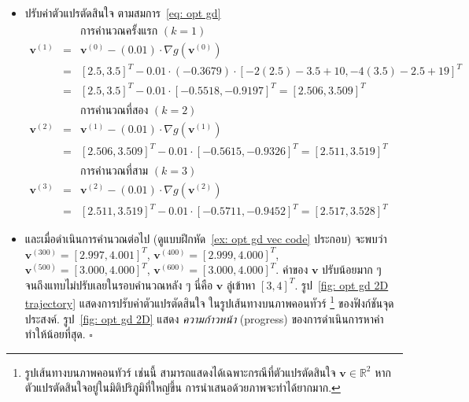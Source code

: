 \begin{itemize}
\item ปรับค่าตัวแปรตัดสินใจ ตามสมการ~\ref{eq: opt gd}
	\\ 
	\begin{eqnarray}
	&\;& \mbox{การคำนวณครั้งแรก } (k=1)
	\nonumber \\
	\bm{v}^{(1)} &=& \bm{v}^{(0)} - (0.01) \cdot \nabla g (\bm{v}^{(0)})
	\nonumber \\
	&=& [2.5, 3.5]^T - 0.01 \cdot (-0.3679) \cdot [-2(2.5)-3.5+10, -4(3.5)-2.5+19]^T
	\nonumber \\
	&=& [2.5, 3.5]^T - 0.01 \cdot [-0.5518,
	-0.9197]^T = [2.506, 3.509]^T
\nonumber \\	
	&\;& \mbox{การคำนวณที่สอง } (k=2)
\nonumber \\		
	\bm{v}^{(2)} &=& \bm{v}^{(1)} - (0.01) \cdot \nabla g (\bm{v}^{(1)})
\nonumber \\	
&=& [2.506, 3.509]^T - 0.01 \cdot [-0.5615, -0.9326]^T = [2.511, 3.519]^T
\nonumber \\
	&\;& \mbox{การคำนวณที่สาม } (k=3)
	\nonumber \\
	\bm{v}^{(3)} &=& \bm{v}^{(2)} - (0.01) \cdot \nabla g (\bm{v}^{(2)})
\nonumber \\	
&=& [2.511, 3.519]^T - 0.01 \cdot [-0.5711, -0.9452]^T = [2.517, 3.528]^T
\nonumber 
	\nonumber
	\end{eqnarray}
	
	\item และเมื่อดำเนินการคำนวณต่อไป
	(ดูแบบฝึกหัด~\ref{ex: opt gd vec code} ประกอบ)
	จะพบว่า 
	$\bm{v}^{(300)} = [2.997, 4.001]^T$,
	$\bm{v}^{(400)} = [2.999, 4.000]^T$,
	$\bm{v}^{(500)} = [3.000, 4.000]^T$,
	$\bm{v}^{(600)} = [3.000, 4.000]^T$.
	ค่าของ $\bm{v}$ ปรับน้อยมาก ๆ จนถึงแทบไม่ปรับเลยในรอบคำนวณหลัง ๆ นี่คือ $\bm{v}$ ลู่เข้าหา $[3, 4]^T$.
	รูป~\ref{fig: opt gd 2D trajectory} แสดงการปรับค่าตัวแปรตัดสินใจ ในรูปเส้นทางบนภาพคอนทัวร์%
	\footnote{รูปเส้นทางบนภาพคอนทัวร์ เช่นนี้ สามารถแสดงได้เฉพาะกรณีที่ตัวแปรตัดสินใจ $\bm{v} \in \mathbb{R}^2$ หากตัวแปรตัดสินใจอยู่ในมิติปริภูมิที่ใหญ่ขึ้น การนำเสนอด้วยภาพจะทำได้ยากมาก.}
	ของฟังก์ชันจุดประสงค์.
	รูป~\ref{fig: opt gd 2D} แสดง \textit{ความก้าวหน้า} (progress) ของการดำเนินการหาค่าทำให้น้อยที่สุด.
	\hfill $\square$
\end{itemize}

